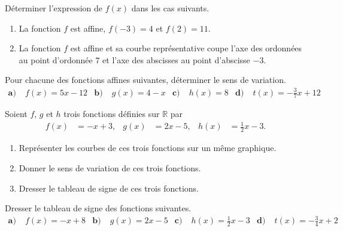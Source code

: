 \documentclass[11pt]{article}
\begin{document}
\begin{exo}
Déterminer l'expression de $f(x)$ dans les cas suivants.
\begin{enumerate}
  \item La fonction $f$ est affine, $f(-3)=4$ et $f(2)=11$.
  \item La fonction $f$ est affine et sa courbe représentative coupe l'axe des
    ordonnées au point d'ordonnée $7$ et l'axe des abscisses au point d'abscisse
    $-3$.
\end{enumerate}
\end{exo}

\begin{exo}
Pour chacune des fonctions affines suivantes,
déterminer le sens de variation.
\begin{align*}
  \textbf{a)}\;& f(x)=5x-12 &
  \textbf{b)}\;& g(x)=4-x &
  \textbf{c)}\;& h(x)=8 &
  \textbf{d)}\;& t(x)=-\frac{3}{7}x+12
\end{align*}
\end{exo}

\begin{exo}
Soient $f$, $g$ et $h$ trois fonctions définies sur
$\mathbb{R}$ par
\begin{align*}
  f(x) &= -x+3, &
  g(x) &=2x-5, &
  h(x) &= \frac{1}{2}x-3.
\end{align*}
\begin{enumerate}
  \item Représenter les courbes de ces trois fonctions sur un même graphique.
  \item Donner le sens de variation de ces trois fonctions.
  \item Dresser le tableau de signe de ces trois fonctions.
\end{enumerate}
\end{exo}

\begin{exo}
Dresser le tableau de signe des fonctions suivantes.
\begin{align*}
  \textbf{a)}\;& f(x)=-x+8 &
  \textbf{b)}\;& g(x)=2x-5 &
  \textbf{c)}\;& h(x)=\frac{1}{2}x-3 &
  \textbf{d)}\;& t(x)=-\frac{3}{4}x+2
\end{align*}
\end{exo}
\end{document}
